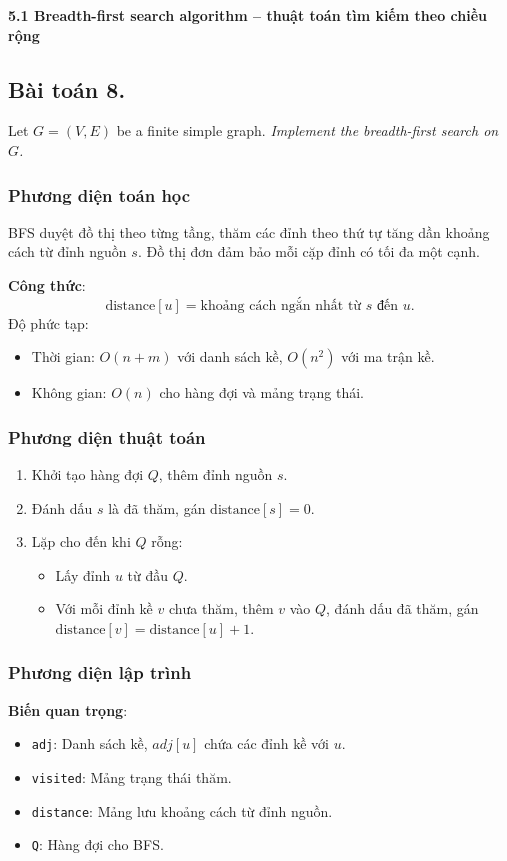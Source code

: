 \documentclass[a4paper,12pt]{article}
\begin{document}
\textbf{5.1 Breadth-first search algorithm – thuật toán tìm kiếm theo chiều rộng}

\subsection{Bài toán 8.} Let $G = (V, E)$ be a finite simple graph. \textit{Implement the breadth-first search on $G$.}

\subsubsection{Phương diện toán học}
BFS duyệt đồ thị theo từng tầng, thăm các đỉnh theo thứ tự tăng dần khoảng cách từ đỉnh nguồn \( s \). Đồ thị đơn đảm bảo mỗi cặp đỉnh có tối đa một cạnh.

\textbf{Công thức}:
\[
\text{distance}[u] = \text{khoảng cách ngắn nhất từ } s \text{ đến } u.
\]
Độ phức tạp:
\begin{itemize}
    \item Thời gian: \( O(n + m) \) với danh sách kề, \( O(n^2) \) với ma trận kề.
    \item Không gian: \( O(n) \) cho hàng đợi và mảng trạng thái.
\end{itemize}

\subsubsection{Phương diện thuật toán}
\begin{enumerate}
    \item Khởi tạo hàng đợi \( Q \), thêm đỉnh nguồn \( s \).
    \item Đánh dấu \( s \) là đã thăm, gán \( \text{distance}[s] = 0 \).
    \item Lặp cho đến khi \( Q \) rỗng:
        \begin{itemize}
            \item Lấy đỉnh \( u \) từ đầu \( Q \).
            \item Với mỗi đỉnh kề \( v \) chưa thăm, thêm \( v \) vào \( Q \), đánh dấu đã thăm, gán \( \text{distance}[v] = \text{distance}[u] + 1 \).
        \end{itemize}
\end{enumerate}

\subsubsection{Phương diện lập trình}
\textbf{Biến quan trọng}:
\begin{itemize}
    \item \texttt{adj}: Danh sách kề, \( adj[u] \) chứa các đỉnh kề với \( u \).
    \item \texttt{visited}: Mảng trạng thái thăm.
    \item \texttt{distance}: Mảng lưu khoảng cách từ đỉnh nguồn.
    \item \texttt{Q}: Hàng đợi cho BFS.
\end{itemize}
\end{document}
